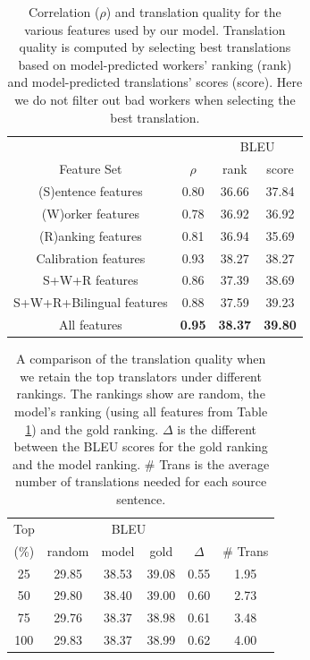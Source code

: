 \documentclass[11pt,letterpaper]{article}
\begin{document}
\begin{table}[htbp]
 \center
\begin{tabular}{c|c|cc}
\hline
 & & \multicolumn{2}{c}{BLEU}\\
Feature Set             & $\rho$  & rank & score    \\ \hhline{====}
(S)entence features     & 0.80 & 36.66 &37.84 \\
(W)orker features       & 0.78 & 36.92 &36.92 \\
(R)anking features      & 0.81 & 36.94 &35.69\\
Calibration features  & 0.93 & 38.27 &38.27\\
S+W+R features          & 0.86 & 37.39 & 38.69\\
S+W+R+Bilingual features        & 0.88 & 37.59 &39.23 \\
All features            & \textbf{0.95} & \textbf{38.37} & \textbf{39.80}\\ \hline
\end{tabular}
\caption{\label{lrresult} Correlation ($\rho$) and translation quality for the various features used by our model.  Translation quality is computed by selecting best translations based on model-predicted workers' ranking (rank) and model-predicted translations' scores (score). Here we do not filter out bad workers when selecting the best translation.}
\end{table}



\begin{table}[htbp]
\center
\begin{tabular}{c|ccccc}
\hline
Top & \multicolumn{4}{c}{BLEU}&\\
 (\%) &random & model & gold & $\Delta$ & \# Trans\\\hhline{======}
25      &29.85& 38.53   & 39.08      & 0.55   & 1.95         \\
50      &29.80& 38.40   & 39.00      & 0.60   & 2.73         \\
75      &29.76& 38.37   & 38.98      & 0.61   & 3.48         \\
100     &29.83& 38.37   & 38.99      & 0.62   & 4.00         \\ \hline
\end{tabular}
\caption{\label{modeltoprank} A comparison of the translation quality when we retain the top translators under different rankings.  The rankings show are random, the model's ranking (using all features from Table \ref{lrresult}) and the gold ranking.  $\Delta$ is the different between the BLEU scores for the gold ranking and the model ranking. \# Trans is the average number of translations needed for each source sentence. 
}
\end{table} 
\end{document}
